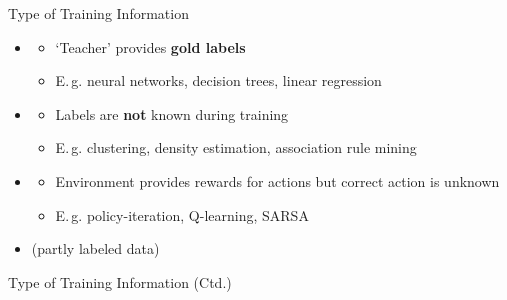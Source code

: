 \begin{frame}{Type of Training Information}{}
	\begin{itemize}
		\item {}
		\begin{itemize}
			\item `Teacher' provides \textbf{gold labels}
			\item E.\,g. neural networks, decision trees, linear regression
		\end{itemize}
		\item {}
		\begin{itemize}
			\item Labels are \textbf{not} known during training
			\item E.\,g. clustering, density estimation, association rule mining
		\end{itemize}
		\item {}
		\begin{itemize}
			\item Environment provides rewards for actions but correct action is unknown
			\item E.\,g. policy-iteration, Q-learning, SARSA
		\end{itemize}
		\item {} (partly labeled data)
	\end{itemize}
\end{frame}


\begin{frame}{Type of Training Information (Ctd.)}{}
	
\end{frame}


